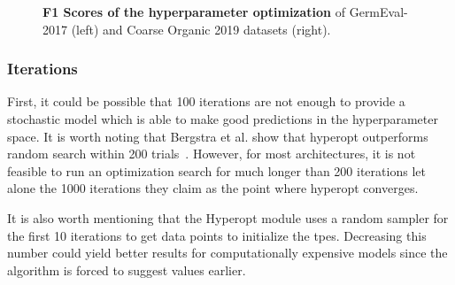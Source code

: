 \begin{figure}[ht]
	\centering
    \caption{\textbf{F1 Scores of the hyperparameter optimization} of GermEval-2017 {(left)} and Coarse Organic 2019 datasets {(right)}.}
    \label{fig:06_F1GermEvalHp}
\end{figure}

\subsubsection*{Iterations}

First, it could be possible that 100 iterations are not enough to provide a stochastic model which is able to make good predictions in the hyperparameter space. It is worth noting that Bergstra et al. show that hyperopt outperforms random search within 200 trials~\cite{Bergstra2013}. However, for most architectures, it is not feasible to run an optimization search for much longer than 200 iterations let alone the 1000 iterations they claim as the point where hyperopt converges. 
\medskip

It is also worth mentioning that the Hyperopt module uses a random sampler for the first 10 iterations to get data points to initialize the \glspl{tpe}. Decreasing this number could yield better results for computationally expensive models since the algorithm is forced to suggest values earlier.

